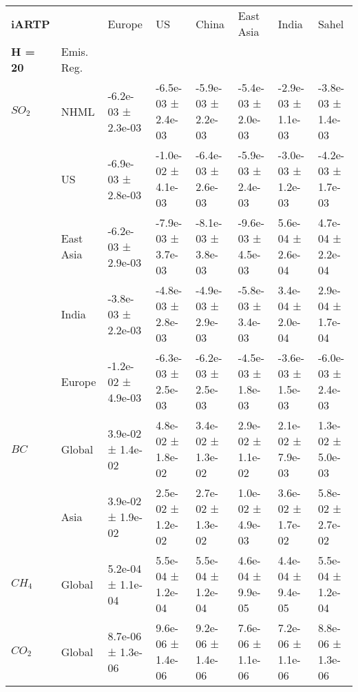 \documentclass[preview]{standalone}
\newcommand{\nm}{\phantom{-}}
\begin{document}
	\tiny
	\begin{minipage}{\textwidth}
		\setlength\tabcolsep{5pt}
		\begin{tabular}{llllllll}
			\toprule
			\textbf{iARTP}        &        &               Europe &                   US &                China &            East Asia &                India &                Sahel \\
			\textbf{H = 20}  & Emis. Reg. &                      &                      &                      &                      &                      &                      \\
			\midrule
$SO_2$ & NHML &  -6.2e-03 ±  2.3e-03 &  -6.5e-03 ±  2.4e-03 &  -5.9e-03 ±  2.2e-03 &  -5.4e-03 ±  2.0e-03 &  -2.9e-03 ±  1.1e-03 &  -3.8e-03 ±  1.4e-03 \\
       & US &  -6.9e-03 ±  2.8e-03 &  -1.0e-02 ±  4.1e-03 &  -6.4e-03 ±  2.6e-03 &  -5.9e-03 ±  2.4e-03 &  -3.0e-03 ±  1.2e-03 &  -4.2e-03 ±  1.7e-03 \\
       & East Asia &  -6.2e-03 ±  2.9e-03 &  -7.9e-03 ±  3.7e-03 &  -8.1e-03 ±  3.8e-03 &  -9.6e-03 ±  4.5e-03 &   \nm5.6e-04 ±  2.6e-04 &   \nm4.7e-04 ±  2.2e-04 \\
       & India &  -3.8e-03 ±  2.2e-03 &  -4.8e-03 ±  2.8e-03 &  -4.9e-03 ±  2.9e-03 &  -5.8e-03 ±  3.4e-03 &   \nm3.4e-04 ±  2.0e-04 &   \nm2.9e-04 ±  1.7e-04 \\
       & Europe &  -1.2e-02 ±  4.9e-03 &  -6.3e-03 ±  2.5e-03 &  -6.2e-03 ±  2.5e-03 &  -4.5e-03 ±  1.8e-03 &  -3.6e-03 ±  1.5e-03 &  -6.0e-03 ±  2.4e-03 \\
\cmidrule(lr){1-8}
$BC$ & Global &   \nm3.9e-02 ±  1.4e-02 &   \nm4.8e-02 ±  1.8e-02 &   \nm3.4e-02 ±  1.3e-02 &   \nm2.9e-02 ±  1.1e-02 &   \nm2.1e-02 ±  7.9e-03 &   \nm1.3e-02 ±  5.0e-03 \\
       & Asia &   \nm3.9e-02 ±  1.9e-02 &   \nm2.5e-02 ±  1.2e-02 &   \nm2.7e-02 ±  1.3e-02 &   \nm1.0e-02 ±  4.9e-03 &   \nm3.6e-02 ±  1.7e-02 &   \nm5.8e-02 ±  2.7e-02 \\
\cmidrule(lr){1-8}
$CH_4$ & Global &   \nm5.2e-04 ±  1.1e-04 &   \nm5.5e-04 ±  1.2e-04 &   \nm5.5e-04 ±  1.2e-04 &   \nm4.6e-04 ±  9.9e-05 &   \nm4.4e-04 ±  9.4e-05 &   \nm5.5e-04 ±  1.2e-04 \\
\cmidrule(lr){1-8}
$CO_2$ & Global &   \nm8.7e-06 ±  1.3e-06 &   \nm9.6e-06 ±  1.4e-06 &  \nm 9.2e-06 ±  1.4e-06 &   \nm7.6e-06 ±  1.1e-06 &   \nm7.2e-06 ±  1.1e-06 &   \nm8.8e-06 ±  1.3e-06 \\
\bottomrule
\end{tabular}

        \end{minipage}
        
\end{document}
